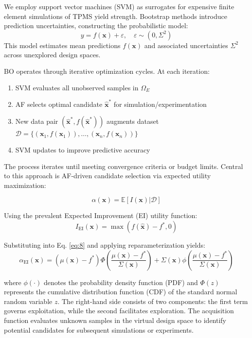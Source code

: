 \documentclass[preprint,review,12pt,authoryear]{elsarticle}
\begin{document}
We employ support vector machines (SVM) as surrogates for expensive finite element simulations of TPMS yield strength. Bootstrap methods introduce prediction uncertainties, constructing the probabilistic model:
$$
y=f(\boldsymbol{x})+\varepsilon,\quad \varepsilon\sim(0, \Sigma^2)
$$
This model estimates mean predictions $f(\boldsymbol{x})$ and associated uncertainties $\Sigma^2$ across unexplored design spaces.

BO operates through iterative optimization cycles. At each iteration:
\begin{enumerate}
    \item SVM evaluates all unobserved samples in $\Omega_E$
    \item AF selects optimal candidate $\hat{\boldsymbol{x}}^*$ for simulation/experimentation
    \item New data pair $(\hat{\boldsymbol{x}}^*, f(\hat{\boldsymbol{x}}^*))$ augments dataset $\mathcal{D} = \{(\boldsymbol{x}_1, f(\boldsymbol{x}_1)), \ldots, (\boldsymbol{x}_n, f(\boldsymbol{x}_n))\}$
    \item SVM updates to improve predictive accuracy
\end{enumerate}

The process iterates until meeting convergence criteria or budget limits. Central to this approach is AF-driven candidate selection via expected utility maximization:

\begin{equation}
\alpha(\boldsymbol{x}) = \mathbb{E}[I(\boldsymbol{x})|\mathcal{D}]
\label{eq:8}
\end{equation}

Using the prevalent Expected Improvement (EI) utility function:
\begin{equation}
I_\text{EI}(\boldsymbol{x})=\max(f(\hat{\boldsymbol{x}})-f^*, 0)
\label{eq:9}    
\end{equation}

Substituting into Eq. \ref{eq:8} and applying reparameterization yields:
\begin{equation}
\alpha_\text{EI}(\boldsymbol{x}) = \left(\mu(\boldsymbol{x}) - f^*\right) \Phi\left(\frac{\mu(\boldsymbol{x}) - f^*}{\Sigma(\boldsymbol{x})}\right) + \Sigma(\boldsymbol{x}) \phi\left(\frac{\mu(\boldsymbol{x}) - f^*}{\Sigma(\boldsymbol{x})}\right)
\label{eq:10}    
\end{equation}

where $\phi(\cdot)$ denotes the probability density function (PDF) and $\Phi(z)$ represents the cumulative distribution function (CDF) of the standard normal random variable $z$. The right-hand side consists of two components: the first term governs exploitation, while the second facilitates exploration. The acquisition function evaluates unknown samples in the virtual design space to identify potential candidates for subsequent simulations or experiments.
\end{document}

